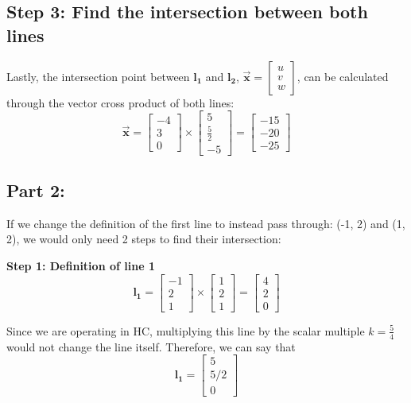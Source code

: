 \documentclass{article}
\begin{document}
\subsection*{Step 3: Find the intersection between both lines}
Lastly, the intersection point between $\boldsymbol{l_1}$ and $\boldsymbol{l_2}$, $\boldsymbol{\Vec{x}} = \begin{bmatrix}
    u \\ v \\ w
\end{bmatrix}$, can be calculated through the vector cross product of both lines:
\[\boldsymbol{\Vec{x}} = \begin{bmatrix}
    -4 \\ 3 \\ 0
\end{bmatrix} \times \begin{bmatrix}
    5 \\ \frac{5}{2} \\ -5
\end{bmatrix} = \begin{bmatrix}
    -15 \\ -20 \\ -25
\end{bmatrix}\]

\subsection*{Part 2:}
If we change the definition of the first line to instead pass through: (-1, 2) and (1, 2), we would only need 2 steps to find their intersection:

\textbf{Step 1: Definition of line 1}
\[\boldsymbol{l_1} = \begin{bmatrix}
    -1 \\ 2 \\ 1
\end{bmatrix} \times \begin{bmatrix}
    1 \\ 2 \\ 1
\end{bmatrix} = \begin{bmatrix}
    4 \\ 2 \\ 0
\end{bmatrix}\]

Since we are operating in HC, multiplying this line by the scalar multiple $k = \frac{5}{4}$ would not change the line itself. Therefore, we can say that \[\boldsymbol{l_1} = \begin{bmatrix}
    5 \\ 5/2 \\ 0
\end{bmatrix}\]
\end{document}
